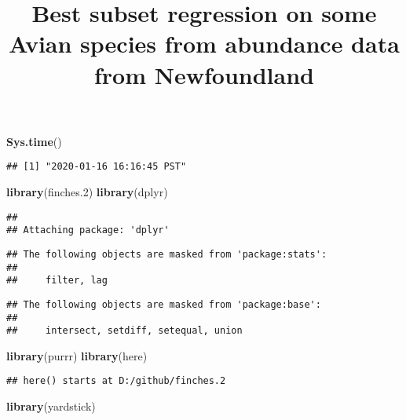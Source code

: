 \documentclass[
]{article}
\title{Best subset regression on some Avian species from abundance data from
Newfoundland}
\author{}
\date{\vspace{-2.5em}}
\newenvironment{Shaded}{\begin{snugshade}}{\end{snugshade}}
\newcommand{\FloatTok}[1]{\textcolor[rgb]{0.00,0.00,0.81}{#1}}
\newcommand{\KeywordTok}[1]{\textcolor[rgb]{0.13,0.29,0.53}{\textbf{#1}}}
\newcommand{\NormalTok}[1]{#1}
\begin{document}
\maketitle

\begin{Shaded}
\begin{Highlighting}[]
\KeywordTok{Sys.time}\NormalTok{()}
\end{Highlighting}
\end{Shaded}

\begin{verbatim}
## [1] "2020-01-16 16:16:45 PST"
\end{verbatim}

\begin{Shaded}
\begin{Highlighting}[]
\KeywordTok{library}\NormalTok{(finches}\FloatTok{.2}\NormalTok{)}
\KeywordTok{library}\NormalTok{(dplyr)}
\end{Highlighting}
\end{Shaded}

\begin{verbatim}
## 
## Attaching package: 'dplyr'
\end{verbatim}

\begin{verbatim}
## The following objects are masked from 'package:stats':
## 
##     filter, lag
\end{verbatim}

\begin{verbatim}
## The following objects are masked from 'package:base':
## 
##     intersect, setdiff, setequal, union
\end{verbatim}

\begin{Shaded}
\begin{Highlighting}[]
\KeywordTok{library}\NormalTok{(purrr)}
\KeywordTok{library}\NormalTok{(here)}
\end{Highlighting}
\end{Shaded}

\begin{verbatim}
## here() starts at D:/github/finches.2
\end{verbatim}

\begin{Shaded}
\begin{Highlighting}[]
\KeywordTok{library}\NormalTok{(yardstick)}
\end{Highlighting}
\end{Shaded}
\end{document}

